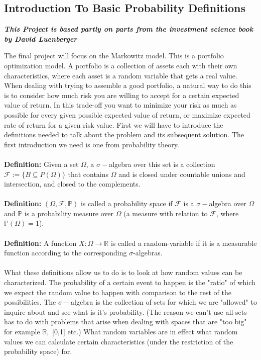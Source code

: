 \documentclass{article}
\begin{document}
\subsection{Introduction To Basic Probability Definitions} 
\begin{center}
\textbf{\textit{This Project is based partly on parts from the investment science book by David Luenberger}}
\end{center}
The final project will focus on the Markowitz model. This is a portfolio optimization model. A portfolio is a collection of assets each with their own characteristics, where each asset is a random variable that gets a real value. When dealing with trying to assemble a good portfolio, a natural way to do this is to consider how much risk you are willing to accept for a certain expected value of return. In this trade-off you want to minimize your risk as much as possible for every given possible expected value of return, or maximize expected rate of return for a given risk value. First we will have to introduce the definitions needed to talk about the problem and its subsequent solution. The first introduction we need is one from probability theory. \\\\
\textbf{Definition:} Given a set $\Omega$, a $\sigma-$algebra over this set is a collection $\mathcal{F}:=\{B\subseteq P(\Omega)\}$ that contains $\Omega$ and is closed under countable unions and intersection, and closed to the complements. \\\\
\textbf{Definition:} $(\Omega,\mathcal{F},\mathbb{P})$ is called a probability space if $\mathcal{F}$ is a $\sigma-$algebra over $\Omega$ and $\mathbb{P}$ is a probability measure over $\Omega$ (a measure with relation to $\mathcal{F}$, where $\mathbb{P}(\Omega)=1$). \\\\
\textbf{Definition:} A function $X:\Omega\rightarrow\mathbb{R}$ is called a random-variable if it is a measurable function according to the corresponding $\sigma$-algebras. \\\\
What these definitions allow us to do is to look at how random values can be characterized. The probability of a certain event to happen is the "ratio" of which we expect the random value to happen with comparison to the rest of the possibilities. The $\sigma-$algebra is the collection of sets for which we are "allowed" to inquire about and see what is it's probability. (The reason we can't use all sets has to do with problems that arise when dealing with spaces that are "too big" for example $\mathbb{R},$ [0,1] etc.) What random variables are in effect what random values we can calculate certain characteristics (under the restriction of the probability space) for.  
\end{document}
